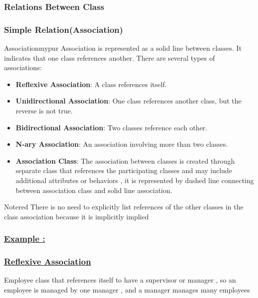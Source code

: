 \subsubsection{Relations Between Class}


\subsubsection*{Simple Relation(Association)}
\begin{prettyBox}{Association}{mypur}
Association is represented as a solid line between classes. It indicates that one class references another. There are several types of associations:
\begin{itemize}
    \item \textbf{Reflexive Association}: A class references itself.
    \item \textbf{Unidirectional Association}: One class references another class, but the reverse is not true.
    \item \textbf{Bidirectional Association}: Two classes reference each other.
    \item \textbf{N-ary Association}: An association involving more than two classes.
    \item \textbf{Association Class}: The association between classes is created through separate class that references the participating classes and may include additional attributes or behaviors ,  it is represented by dashed line 
connecting between association class and solid line association.
\end{itemize}
\end{prettyBox}

\vspace{0.25cm}

\begin{prettyBox}{Note}{red}
There is no need to explicitly list references of the other classes in the class association
because it is implicitly implied
\end{prettyBox}

\subsubsection*{\underline{Example :}}

\subsubsection*{\underline{Reflexive Association}}
Employee class that references itself to have a supervisor or manager , so an employee is managed by one manager , and a manager manages many employees 

